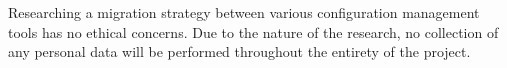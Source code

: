 Researching a migration strategy between various configuration management tools has no ethical concerns. Due to the nature of the research, no collection of any personal data will be performed throughout the entirety of the project.
